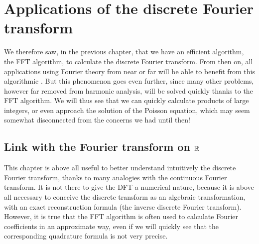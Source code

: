  
\chapter{Applications of the discrete Fourier transform}
\label{chap-applications-tfd} 
 
 
 
We therefore saw, in the previous chapter, that we have an efficient algorithm, the FFT algorithm, to calculate the discrete Fourier transform. From then on, all applications using Fourier theory from near or far will be able to benefit from this algorithmic . But this phenomenon goes even further, since many other problems, however far removed from harmonic analysis, will be solved quickly thanks to the FFT algorithm. We will thus see that we can quickly calculate products of large integers, or even approach the solution of the Poisson equation, which may seem somewhat disconnected from the concerns we had until then!
 
\section{Link with the Fourier transform on $ \mathbb{R} $}
\label{sect1-link-trans-fourier-R} 
 
This chapter is above all useful to better understand intuitively the discrete Fourier transform, thanks to many analogies with the continuous Fourier transform. It is not there to give the DFT a numerical nature, because it is above all necessary to conceive the discrete transform as an algebraic transformation, with an exact reconstruction formula (the inverse discrete Fourier transform). However, it is true that the FFT algorithm is often used to calculate Fourier coefficients in an approximate way, even if we will quickly see that the corresponding quadrature formula is not very precise.
